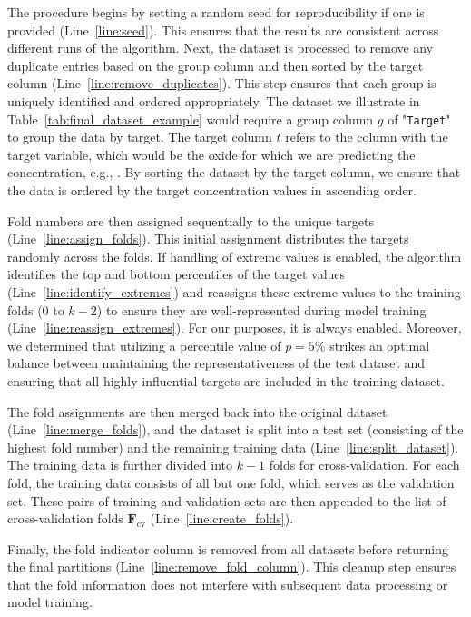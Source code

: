 The procedure begins by setting a random seed for reproducibility if one is provided (Line~\ref{line:seed}).
This ensures that the results are consistent across different runs of the algorithm.
Next, the dataset is processed to remove any duplicate entries based on the group column and then sorted by the target column (Line~\ref{line:remove_duplicates}).
This step ensures that each group is uniquely identified and ordered appropriately.
The dataset we illustrate in Table~\ref{tab:final_dataset_example} would require a group column $g$ of "\texttt{Target}" to group the data by target.
The target column $t$ refers to the column with the target variable, which would be the oxide for which we are predicting the concentration, e.g., .
By sorting the dataset by the target column, we ensure that the data is ordered by the target concentration values in ascending order.

Fold numbers are then assigned sequentially to the unique targets (Line~\ref{line:assign_folds}).
This initial assignment distributes the targets randomly across the folds.
If handling of extreme values is enabled, the algorithm identifies the top and bottom percentiles of the target values (Line~\ref{line:identify_extremes}) and reassigns these extreme values to the training folds (0 to \( k-2 \)) to ensure they are well-represented during model training (Line~\ref{line:reassign_extremes}).
For our purposes, it is always enabled.
Moreover, we determined that utilizing a percentile value of $p=5\%$ strikes an optimal balance between maintaining the representativeness of the test dataset and ensuring that all highly influential targets are included in the training dataset.

The fold assignments are then merged back into the original dataset (Line~\ref{line:merge_folds}), and the dataset is split into a test set (consisting of the highest fold number) and the remaining training data (Line~\ref{line:split_dataset}).
The training data is further divided into \( k-1 \) folds for cross-validation.
For each fold, the training data consists of all but one fold, which serves as the validation set.
These pairs of training and validation sets are then appended to the list of cross-validation folds \(\mathbf{F}_\text{cv}\) (Line~\ref{line:create_folds}).

Finally, the fold indicator column is removed from all datasets before returning the final partitions (Line~\ref{line:remove_fold_column}).
This cleanup step ensures that the fold information does not interfere with subsequent data processing or model training.

